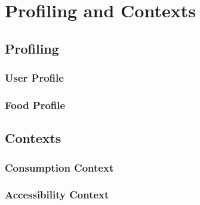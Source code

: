 \chapter{Profiling and Contexts}

\section{Profiling}

\subsection{User Profile}
\subsection{Food Profile}

\section{Contexts}

\subsection{Consumption Context}

\subsection{Accessibility Context}
